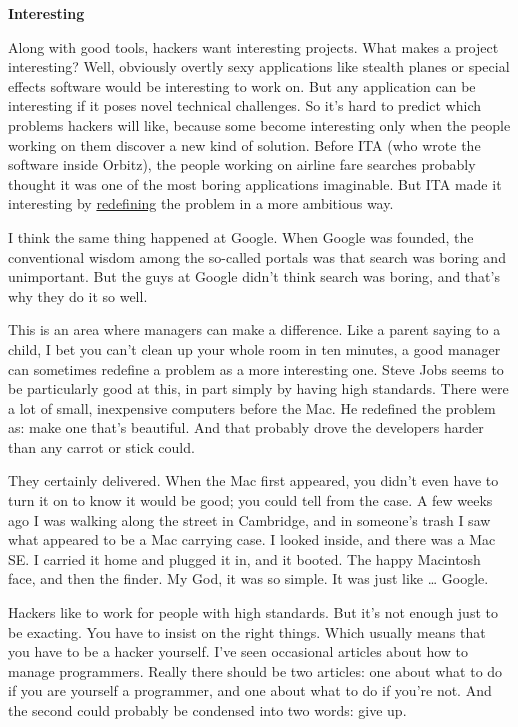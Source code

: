 \documentclass[12pt]{book}
\begin{document}
\textbf{Interesting}

Along with good tools, hackers want interesting projects. What makes a
project interesting? Well, obviously overtly sexy applications like
stealth planes or special effects software would be interesting to work
on. But any application can be interesting if it poses novel technical
challenges. So it's hard to predict which problems hackers will like,
because some become interesting only when the people working on them
discover a new kind of solution. Before ITA (who wrote the software
inside Orbitz), the people working on airline fare searches probably
thought it was one of the most boring applications imaginable. But ITA
made it interesting by \href{carl.html}{redefining} the problem in a
more ambitious way.

I think the same thing happened at Google. When Google was founded, the
conventional wisdom among the so-called portals was that search was
boring and unimportant. But the guys at Google didn't think search was
boring, and that's why they do it so well.

This is an area where managers can make a difference. Like a parent
saying to a child, I bet you can't clean up your whole room in ten
minutes, a good manager can sometimes redefine a problem as a more
interesting one. Steve Jobs seems to be particularly good at this, in
part simply by having high standards. There were a lot of small,
inexpensive computers before the Mac. He redefined the problem as: make
one that's beautiful. And that probably drove the developers harder than
any carrot or stick could.

They certainly delivered. When the Mac first appeared, you didn't even
have to turn it on to know it would be good; you could tell from the
case. A few weeks ago I was walking along the street in Cambridge, and
in someone's trash I saw what appeared to be a Mac carrying case. I
looked inside, and there was a Mac SE. I carried it home and plugged it
in, and it booted. The happy Macintosh face, and then the finder. My
God, it was so simple. It was just like \ldots{} Google.

Hackers like to work for people with high standards. But it's not enough
just to be exacting. You have to insist on the right things. Which
usually means that you have to be a hacker yourself. I've seen
occasional articles about how to manage programmers. Really there should
be two articles: one about what to do if you are yourself a programmer,
and one about what to do if you're not. And the second could probably be
condensed into two words: give up.
\end{document}
